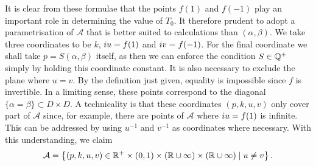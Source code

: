 \documentclass{article}
\begin{document}














It is clear from these formulae that the points $f(1)$ and $f(-1)$ play an important role in determining the value of $T_0$. It therefore prudent to adopt a parametrisation of $\mathcal{A}$ that is better suited to calculations than $(\alpha,\beta)$. We take three coordinates to be $k$, $i u = f(1)$ and $i v = f(-1)$. For the final coordinate we shall take $p=S(\alpha,\beta)$ itself, as then we can enforce the condition $S\in\mathbb{Q}^+$ simply by holding this coordinate constant. 
It is also necessary to exclude the plane where $u=v$. By the definition just given, equality is impossible since $f$ is invertible. In a limiting sense, these points correspond to the diagonal $\{\alpha=\beta\} \subset D\times D$. 
A technicality is that these coordinates $(p,k,u,v)$ only cover part of $\mathcal{A}$ since, for example, there are points of $\mathcal{A}$ where $i u = f(1)$ is infinite. This can be addressed by using $u^{-1}$ and $v^{-1}$ as coordinates where necessary. With this understanding, we claim
\[
\mathcal{A} = \left\{ (p,k,u,v) \in \mathbb{R}^+ \times (0,1) \times (\mathbb{R}\cup\infty)\times (\mathbb{R}\cup\infty) \mid u\neq v\right\}.
\]
\end{document}
